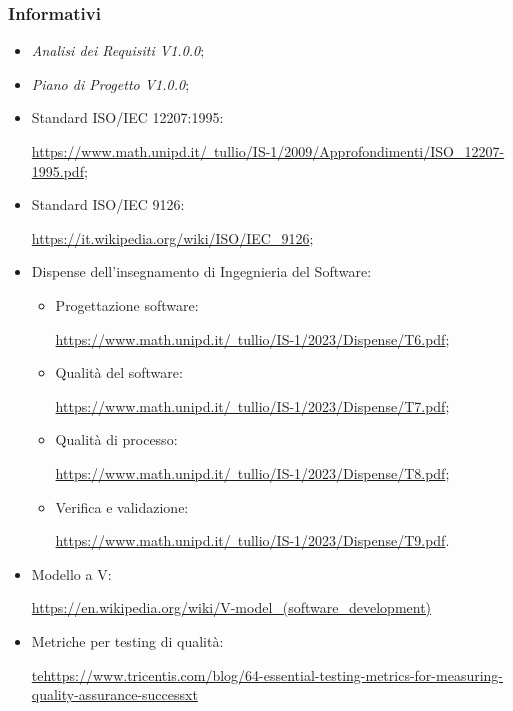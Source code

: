     \subsubsection{Informativi}
        \begin{itemize}
            \item \textit{Analisi dei Requisiti V1.0.0};
            \item \textit{Piano di Progetto V1.0.0};
            \item Standard ISO/IEC 12207:1995:
            
                \href{https://www.math.unipd.it/~tullio/IS-1/2009/Approfondimenti/ISO_12207-1995.pdf}{https://www.math.unipd.it/~tullio/IS-1/2009/Approfondimenti/ISO\_12207-1995.pdf};

            \item Standard ISO/IEC 9126:
            
                 \href{https://it.wikipedia.org/wiki/ISO/IEC_9126}{https://it.wikipedia.org/wiki/ISO/IEC\_9126};
            \clearpage
            \item Dispense dell'insegnamento di Ingegnieria del Software:
                \begin{itemize}
                    \item Progettazione software:
                    
                        \href{https://www.math.unipd.it/~tullio/IS-1/2023/Dispense/T6.pdf}{https://www.math.unipd.it/~tullio/IS-1/2023/Dispense/T6.pdf};

                    \item Qualità del software:
                    
                        \href{https://www.math.unipd.it/~tullio/IS-1/2023/Dispense/T7.pdf}{https://www.math.unipd.it/~tullio/IS-1/2023/Dispense/T7.pdf};

                    \item Qualità di processo:
                    
                    \href{https://www.math.unipd.it/~tullio/IS-1/2023/Dispense/T8.pdf}{https://www.math.unipd.it/~tullio/IS-1/2023/Dispense/T8.pdf};


                    \item Verifica e validazione:
                    
                    \href{https://www.math.unipd.it/~tullio/IS-1/2023/Dispense/T9.pdf}{https://www.math.unipd.it/~tullio/IS-1/2023/Dispense/T9.pdf}.
                \end{itemize}
            \item Modello a V:
            
                \href{https://en.wikipedia.org/wiki/V-model_(software_development)}{https://en.wikipedia.org/wiki/V-model\_(software\_development)}
            \item Metriche per testing di qualità:
            
                \href{https://www.tricentis.com/blog/64-essential-testing-metrics-for-measuring-quality-assurance-success}{tehttps://www.tricentis.com/blog/64-essential-testing-metrics-for-measuring-quality-assurance-successxt}
        \end{itemize}
        \clearpage

